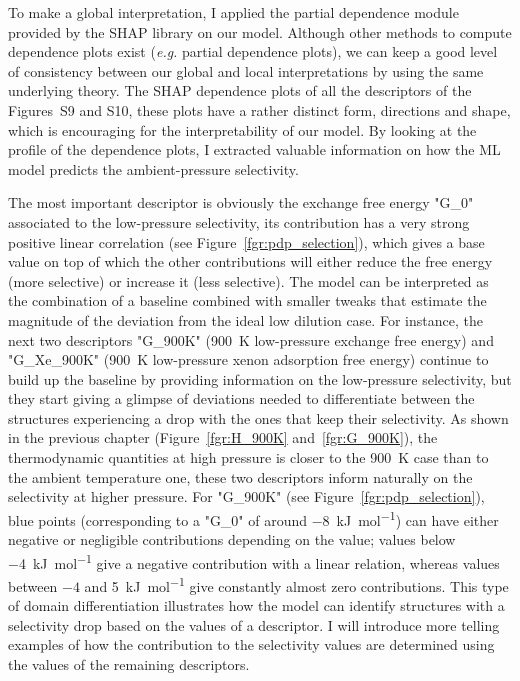 \documentclass[main]{subfiles}
\begin{document}
To make a global interpretation, I applied the partial dependence module provided by the SHAP library on our model. Although other methods to compute dependence plots exist (\emph{e.g.} partial dependence plots),\autocite{molnar2020interpretable} we can keep a good level of consistency between our global and local interpretations by using the same underlying theory. The SHAP dependence plots of all the descriptors of the Figures~S9 and S10, these plots have a rather distinct form, directions and shape, which is encouraging for the interpretability of our model. By looking at the profile of the dependence plots, I extracted valuable information on how the ML model predicts the ambient-pressure selectivity.

The most important descriptor is obviously the exchange free energy "G\_0" associated to the low-pressure selectivity, its contribution has a very strong positive linear correlation (see Figure~\ref{fgr:pdp_selection}), which gives a base value on top of which the other contributions will either reduce the free energy (more selective) or increase it (less selective). The model can be interpreted as the combination of a baseline combined with smaller tweaks that estimate the magnitude of the deviation from the ideal low dilution case. For instance, the next two descriptors "G\_900K" (\SI{900}{\kelvin} low-pressure exchange free energy) and "G\_Xe\_900K" (\SI{900}{\kelvin} low-pressure xenon adsorption free energy) continue to build up the baseline by providing information on the low-pressure selectivity, but they start giving a glimpse of deviations needed to differentiate between the structures experiencing a drop with the ones that keep their selectivity. As shown in the previous chapter (Figure~\ref{fgr:H_900K} and~\ref{fgr:G_900K}), the thermodynamic quantities at high pressure is closer to the \SI{900}{\kelvin} case than to the ambient temperature one, these two descriptors inform naturally on the selectivity at higher pressure. For "G\_900K" (see Figure~\ref{fgr:pdp_selection}), blue points (corresponding to a "G\_0" of around \SI{-8}{\kilo\joule\per\mole}) can have either negative or negligible contributions depending on the value; values below \SI{-4}{\kilo\joule\per\mole} give a negative contribution with a linear relation, whereas values between $-4$ and \SI{5}{\kilo\joule\per\mole} give constantly almost zero contributions. This type of domain differentiation illustrates how the model can identify structures with a selectivity drop based on the values of a descriptor. I will introduce more telling examples of how the contribution to the selectivity values are determined using the values of the remaining descriptors.
\end{document}
